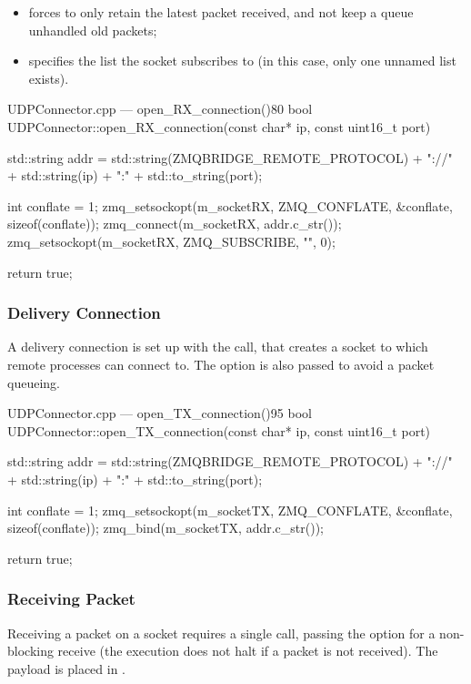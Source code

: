 \begin{itemize}
	\item {} forces  to only retain the latest \gls{packet} received, and not keep a queue unhandled old \glspl{packet};
	\item {} specifies the list the socket subscribes to (in this case, only one unnamed list exists).
\end{itemize}

\begin{codelist}{UDPConnector.cpp --- open\_RX\_connection()}{80}
bool UDPConnector::open_RX_connection(const char* ip, const uint16_t port) {

	std::string addr = std::string(ZMQBRIDGE_REMOTE_PROTOCOL) + "://" + std::string(ip) + ":" + std::to_string(port);

	int conflate = 1;
	zmq_setsockopt(m_socketRX, ZMQ_CONFLATE, &conflate, sizeof(conflate));
	zmq_connect(m_socketRX, addr.c_str());
	zmq_setsockopt(m_socketRX, ZMQ_SUBSCRIBE, "", 0);

	return true;
}
\end{codelist}

\subsubsection{Delivery Connection}

A delivery connection is set up with the  call, that creates a socket to which remote  processes can connect to. The  option is also passed to avoid a \gls{packet} queueing.

\begin{codelist}{UDPConnector.cpp --- open\_TX\_connection()}{95}
bool UDPConnector::open_TX_connection(const char* ip, const uint16_t port) {
	std::string addr = std::string(ZMQBRIDGE_REMOTE_PROTOCOL) + "://" + std::string(ip) + ":" + std::to_string(port);

	int conflate = 1;
	zmq_setsockopt(m_socketTX, ZMQ_CONFLATE, &conflate, sizeof(conflate));
	zmq_bind(m_socketTX, addr.c_str());

	return true;
}
\end{codelist}

\subsubsection{Receiving Packet}

Receiving a \gls{packet} on a socket requires a single  call, passing the  option for a non-blocking receive (the execution does not halt if a \gls{packet} is not received). The \gls{payload} is placed in .

